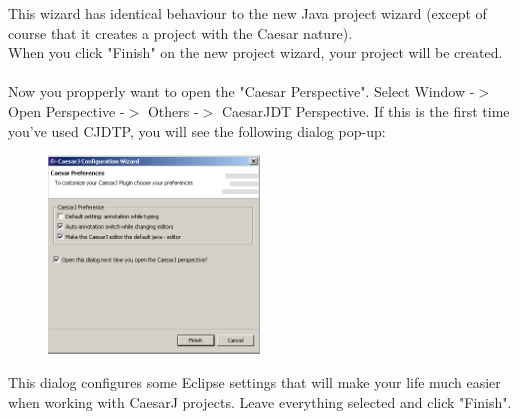 This wizard has identical behaviour to the new Java project wizard (except of course that
it creates a project with the Caesar nature).\\
When you click "Finish" on the new project wizard, your project will be created.\\\\
Now you propperly want to open the "Caesar Perspective". Select Window -$>$ Open Perspective -$>$ Others -$>$ CaesarJDT Perspective.
If this is the first time you've used CJDTP, you will see the following dialog pop-up:\\
\begin{figure}[htbp]
	\centering
		\includegraphics[width=0.5\textwidth]{images/view_properties.png}
	\label{fig:view_properties}
\end{figure}


This dialog configures some Eclipse settings that will make your life much easier when
working with CaesarJ projects. Leave everything selected and click
"Finish".
